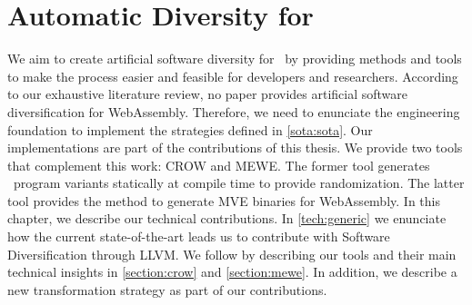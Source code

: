 \chapter{Automatic Diversity for \wasm}
\label{chapter:technical}


We aim to create artificial software diversity for \wasm\ by providing methods and tools to make the process easier and feasible for developers and researchers. According to our exhaustive literature review, no paper provides artificial software diversification for WebAssembly. Therefore, we need to enunciate the engineering foundation to implement the strategies defined in \autoref{sota:sota}. Our implementations are part of the contributions of this thesis. We provide two tools that complement this work: CROW and MEWE. The former tool generates \wasm\ program variants statically at compile time to provide randomization. The latter tool provides the method to generate MVE binaries for WebAssembly.
In this chapter, we describe our technical contributions. In \autoref{tech:generic} we enunciate how the current state-of-the-art leads us to contribute with Software Diversification through LLVM. We follow by describing our tools and their main technical insights in \autoref{section:crow} and \autoref{section:mewe}. In addition, we describe a new transformation strategy as part of our contributions. 


















